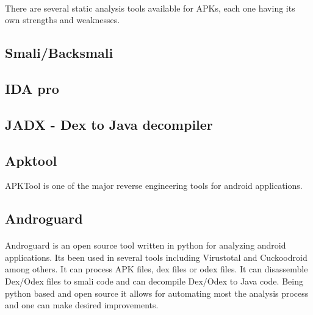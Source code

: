 \documentclass[../main.tex]{subfile}
\begin{document}
		\paragraph{} There are several static analysis tools available for APKs, each one having its own strengths and weaknesses.
		\subsection{Smali/Backsmali}
		\subsection{IDA pro}
		\subsection{JADX - Dex to Java decompiler}
		\subsection{Apktool}\label{sec:apktool}
		APKTool is one of the major reverse engineering tools for android applications.  
		\subsection{Androguard}\label{sec:androguard}
		\paragraph{} Androguard is an open source tool written in python for analyzing android applications. Its been used in several tools including Virustotal and Cuckoodroid among others. It can process APK files, dex files or odex files. It can disassemble Dex/Odex files to smali code and can decompile Dex/Odex to Java code. Being python based and open source it allows for automating most the analysis process and one can make desired improvements.
		
\end{document}
